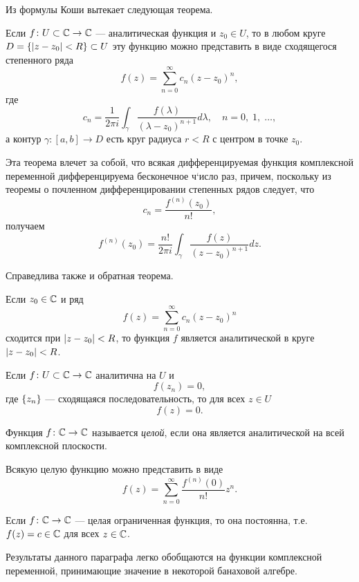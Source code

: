 Из формулы Коши вытекает следующая теорема.
\begin{theorem}\label{th:analytic}
    Если $f \colon U \subset \mathbb{C} \to \mathbb{C}$ --- аналитическая функция и $z_0 \in U$,
    то в любом круге $D = \left\{\left|z-z_0\right| < R\right\} \subset U$ эту функцию можно представить в
    виде сходящегося степенного ряда
    \[ f(z) = \sum_{n=0}^\infty c_n (z - z_0)^n, \]
    где 
    \[ c_n = \dfrac{1}{2\pi i} \int_\gamma \dfrac{f(\lambda)}{(\lambda - z_0)^{n+1}} d \lambda,
        \quad n = 0,\; 1,\; \dotsc, \]
    а контур $\gamma \colon [a, b] \to D$ есть круг радиуса $r < R$ с центром в точке $z_0$. 
\end{theorem}

Эта теорема влечет за собой, что всякая дифференцируемая функция комплексной переменной
дифференцируема бесконечное ч`исло раз, причем, поскольку
из теоремы о почленном дифференцировании степенных рядов следует, что
\[ c_n = \frac{f^{(n)}(z_0)}{n!}, \]
получаем
\[ f^{(n)}(z_0) = \dfrac{n!}{2\pi i} 
    \int_\gamma \dfrac{f(z)}{(z - z_0)^{n+1}} d z. \]

Справедлива также и обратная теорема.
\begin{theorem}\label{th:tayloranalytic}
    Если $z_0 \in \mathbb{C}$ и ряд
    \[ f(z) = \sum_{n=0}^\infty c_n (z - z_0)^n \]
    сходится при $\left|z-z_0\right| < R$,
    то функция $f$ является аналитической в круге $\left|z - z_0\right| < R$.
\end{theorem}

\begin{theorem}[единственности]
    Если $f \colon U \subset \mathbb{C} \to \mathbb{C}$ аналитична на $U$ и
    \[ f(z_n) = 0, \]
    где $\left\{z_n\right\}$ --- сходящаяся последовательность, то для всех $z \in U$
    \[ f(z) = 0. \]
\end{theorem}

\begin{definition}
    Функция $f \colon \mathbb{C} \to \mathbb{C}$ называется \emph{целой}, если
    она является аналитической на всей комплексной плоскости.
\end{definition}

Всякую целую функцию можно представить в виде
\[ f(z) = \sum_{n=0}^\infty \frac{f^{(n)}(0)}{n!} z^n. \]

\begin{theorem}[Лиувилля]\label{th:liouville}
    Если $f \colon \mathbb{C} \to \mathbb{C}$ --- целая ограниченная функция, то она постоянна, 
    т.е. $f(z) = c \in \mathbb{C}$ для всех $z \in \mathbb{C}$.
\end{theorem}

\vspace{0.5cm}

Результаты данного параграфа легко обобщаются на функции комплексной переменной, принимающие
значение в некоторой банаховой алгебре.
